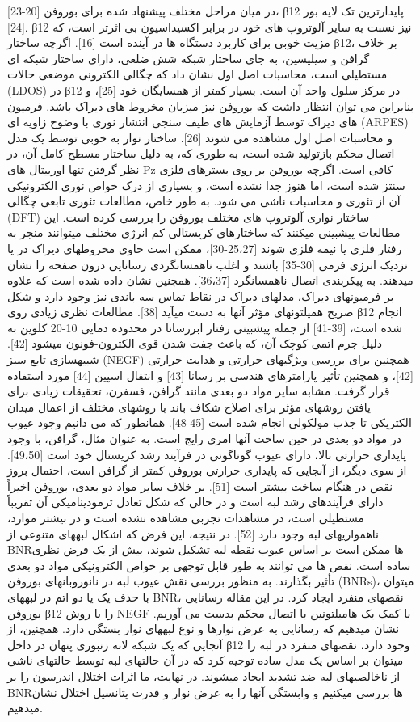 در میان مراحل مختلف پیشنهاد شده برای بوروفن [20-23]، β12  پایدارترین تک لایه بور [24]. β12 نیز نسبت به سایر آلوتروپ های خود در برابر اکسیداسیون بی اثرتر است، که مزیت خوبی برای کاربرد دستگاه ها در آینده است [16]. اگرچه ساختار β12، بر خلاف گرافن و سیلیسین، به جای ساختار شبکه شش ضلعی، دارای ساختار شبکه ای مستطیلی است، محاسبات اصل اول نشان داد که چگالی الکترونی موضعی حالات (LDOS) در β12 در مرکز سلول واحد آن است. بسیار کمتر از همسایگان خود [25]، و بنابراین می توان انتظار داشت که بوروفن نیز میزبان مخروط های دیراک باشد. فرمیون های دیراک توسط آزمایش های طیف سنجی انتشار نوری با وضوح زاویه ای (ARPES) و محاسبات اصل اول مشاهده می شوند [26]. ساختار نوار به خوبی توسط یک مدل اتصال محکم بازتولید شده است، به طوری که، به دلیل ساختار مسطح کامل آن، در نظر گرفتن تنها اوربیتال های Pz کافی است. اگرچه بوروفن بر روی بسترهای فلزی سنتز شده است، اما هنوز جدا نشده است، و بسیاری از درک خواص نوری الکترونیکی آن از تئوری و محاسبات ناشی می شود. به طور خاص، مطالعات تئوری تابعی چگالی (DFT) ساختار نواری آلوتروپ های مختلف بوروفن را بررسی کرده است. این مطالعات پیشبینی میکنند که ساختارهای کریستالی کم انرژی مختلف میتوانند منجر به رفتار فلزی یا نیمه فلزی شوند [25،27-30]، ممکن است حاوی مخروطهای دیراک در یا نزدیک انرژی فرمی [30-35] باشند و اغلب ناهمسانگردی رسانایی درون صفحه را نشان میدهند. به پیکربندی اتصال ناهمسانگرد [36،37]. همچنین نشان داده شده است که علاوه بر فرمیونهای دیراک، مدلهای دیراک در نقاط تماس سه باندی نیز وجود دارد و شکل صریح همیلتونهای مؤثر آنها به دست میآید [38]. مطالعات نظری زیادی روی β12 انجام شده است، [39-41] از جمله پیشبینی رفتار ابررسانا در محدوده دمایی 10-20 کلوین به دلیل جرم اتمی کوچک آن، که باعث جفت شدن قوی الکترون-فونون میشود [42].
شبیهسازی تابع سبز (NEGF) همچنین برای بررسی ویژگیهای حرارتی و هدایت حرارتی [42]، و همچنین تأثیر پارامترهای هندسی بر رسانا [43] و انتقال اسپین [44] مورد استفاده قرار گرفت. مشابه سایر مواد دو بعدی مانند گرافن، فسفرن، تحقیقات زیادی برای یافتن روشهای مؤثر برای اصلاح شکاف باند با روشهای مختلف از اعمال میدان الکتریکی تا جذب مولکولی انجام شده است [45-48]. همانطور که می دانیم وجود عیوب در مواد دو بعدی در حین ساخت آنها امری رایج است. به عنوان مثال، گرافن، با وجود پایداری حرارتی بالا، دارای عیوب گوناگونی در فرآیند رشد کریستال خود است [49،50]. از سوی دیگر، از آنجایی که پایداری حرارتی بوروفن کمتر از گرافن است، احتمال بروز نقص در هنگام ساخت بیشتر است [51]. بر خلاف سایر مواد دو بعدی، بوروفن اخیراً دارای فرآیندهای رشد لبه است و در حالی که شکل تعادل ترمودینامیکی آن تقریباً مستطیلی است، در مشاهدات تجربی مشاهده نشده است و در بیشتر موارد، ناهمواریهای لبه وجود دارد [52]. در نتیجه، این فرض که اشکال لبههای متنوعی از BNRها ممکن است بر اساس عیوب نقطه لبه تشکیل شوند، بیش از یک فرض نظری ساده است. نقص ها می توانند به طور قابل توجهی بر خواص الکترونیکی مواد دو بعدی تأثیر بگذارند. به منظور بررسی نقش عیوب لبه در نانوروبانهای بوروفن (BNRs)، میتوان با حذف یک یا دو اتم در لبههای BNR، نقصهای منفرد ایجاد کرد. در این مقاله رسانایی بوروفن β12 را با روش NEGF با کمک یک هامیلتونین با اتصال محکم بدست می آوریم. نشان میدهیم که رسانایی به عرض نوارها و نوع لبههای نوار بستگی دارد. همچنین، از آنجایی که یک شبکه لانه زنبوری پنهان در داخل β12 وجود دارد، نقصهای منفرد در لبه را میتوان بر اساس یک مدل ساده توجیه کرد که در آن حالتهای لبه توسط حالتهای ناشی از ناخالصیهای لبه ضد تشدید ایجاد میشوند. در نهایت، ما اثرات اختلال اندرسون را بر BNRها بررسی میکنیم و وابستگی آنها را به عرض نوار و قدرت پتانسیل اختلال نشان میدهیم.
